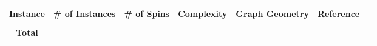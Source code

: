 \documentclass{standalone}
\begin{document}
\begin{tabular}{ |c|c|c|c|c|c|c| } 
    \hline
    \textbf{Instance} & \textbf{\# of Instances} & \textbf{\# of Spins} & \textbf{Complexity} & \textbf{Graph Geometry} & \textbf{Reference}\\ 
    \hline
     & & & & & \\
     \hline
    \textbf{Total} & & & & & \\
    \hline
\end{tabular}
\end{document}
